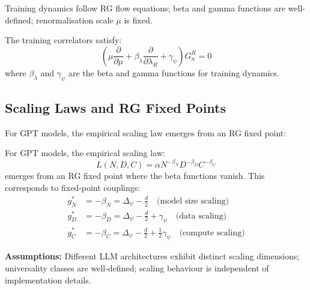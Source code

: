 \begin{assumption}
Training dynamics follow RG flow equations; beta and gamma functions are well-defined; renormalisation scale $\mu$ is fixed.
\end{assumption}

\begin{theorem}
\label{thm:callan_symanzik_training}
The training correlators satisfy:
\begin{equation}
  \left(\mu \frac{\partial}{\partial \mu} + \beta_\lambda \frac{\partial}{\partial \lambda_R} + \gamma_\psi \right) G_n^R = 0
  \label{eq:callan_symanzik_training}
\end{equation}
where $\beta_\lambda$ and $\gamma_\psi$ are the beta and gamma functions for training dynamics.
\end{theorem}

\subsection{Scaling Laws and RG Fixed Points}

For GPT models, the empirical scaling law emerges from an RG fixed point:

\begin{example}
\label{ex:gpt_rg_fixed_point}
For GPT models, the empirical scaling law:
\begin{equation}
  L(N,D,C) = \alpha N^{-\beta_N} D^{-\beta_D} C^{-\beta_C}
  \label{eq:gpt_scaling}
\end{equation}
emerges from an RG fixed point where the beta functions vanish. This corresponds to fixed-point couplings:
\begin{align}
  g_N^* &= -\beta_N = \Delta_\psi - \frac{d}{2} \quad \text{(model size scaling)} \label{eq:gpt-gn} \\
  g_D^* &= -\beta_D = \Delta_\psi - \frac{d}{2} + \gamma_\psi \quad \text{(data scaling)} \label{eq:gpt-gd} \\
  g_C^* &= -\beta_C = \Delta_\psi - \frac{d}{2} + \frac{1}{2}\gamma_\psi \quad \text{(compute scaling)} \label{eq:gpt-gc}
\end{align}
\end{example}

\begin{notation}[Hypotheses]
\label{not:hypotheses-llm}
\textbf{Assumptions:} Different LLM architectures exhibit distinct scaling dimensions; universality classes are well-defined; scaling behaviour is independent of implementation details.
\end{notation}

